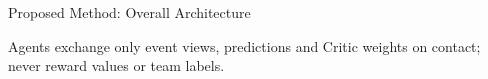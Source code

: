 \documentclass[aspectratio=169,10pt]{beamer}
\begin{document}
\begin{frame}{Proposed Method: Overall Architecture}
\centering
\resizebox{\linewidth}{!}{}

\vspace{4pt}
{\footnotesize Agents exchange only event views, predictions and Critic weights on contact; never reward values or team labels.}
\end{frame}
\end{document}
